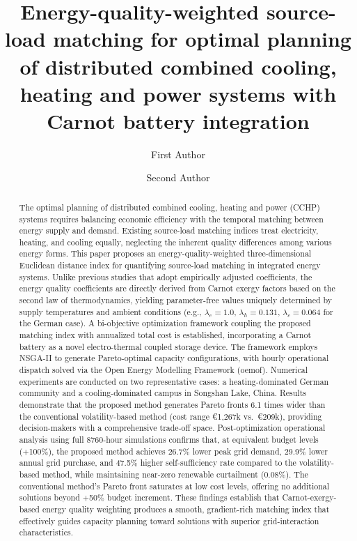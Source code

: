 \documentclass[review]{elsarticle}
\begin{document}
\begin{frontmatter}

\title{Energy-quality-weighted source-load matching for optimal planning of distributed combined cooling, heating and power systems with Carnot battery integration}

\author[1]{First Author}
\author[1]{Second Author}


\begin{abstract}
The optimal planning of distributed combined cooling, heating and power (CCHP) systems requires balancing economic efficiency with the temporal matching between energy supply and demand. Existing source-load matching indices treat electricity, heating, and cooling equally, neglecting the inherent quality differences among various energy forms. This paper proposes an energy-quality-weighted three-dimensional Euclidean distance index for quantifying source-load matching in integrated energy systems. Unlike previous studies that adopt empirically adjusted coefficients, the energy quality coefficients are directly derived from Carnot exergy factors based on the second law of thermodynamics, yielding parameter-free values uniquely determined by supply temperatures and ambient conditions (e.g., $\lambda_e = 1.0$, $\lambda_h = 0.131$, $\lambda_c = 0.064$ for the German case). A bi-objective optimization framework coupling the proposed matching index with annualized total cost is established, incorporating a Carnot battery as a novel electro-thermal coupled storage device. The framework employs NSGA-II to generate Pareto-optimal capacity configurations, with hourly operational dispatch solved via the Open Energy Modelling Framework (oemof). Numerical experiments are conducted on two representative cases: a heating-dominated German community and a cooling-dominated campus in Songshan Lake, China. Results demonstrate that the proposed method generates Pareto fronts 6.1 times wider than the conventional volatility-based method (cost range \euro{}1,267k vs.\ \euro{}209k), providing decision-makers with a comprehensive trade-off space. Post-optimization operational analysis using full 8760-hour simulations confirms that, at equivalent budget levels (+100\%), the proposed method achieves 26.7\% lower peak grid demand, 29.9\% lower annual grid purchase, and 47.5\% higher self-sufficiency rate compared to the volatility-based method, while maintaining near-zero renewable curtailment (0.08\%). The conventional method's Pareto front saturates at low cost levels, offering no additional solutions beyond +50\% budget increment. These findings establish that Carnot-exergy-based energy quality weighting produces a smooth, gradient-rich matching index that effectively guides capacity planning toward solutions with superior grid-interaction characteristics.
\end{abstract}


\end{frontmatter}
\end{document}
